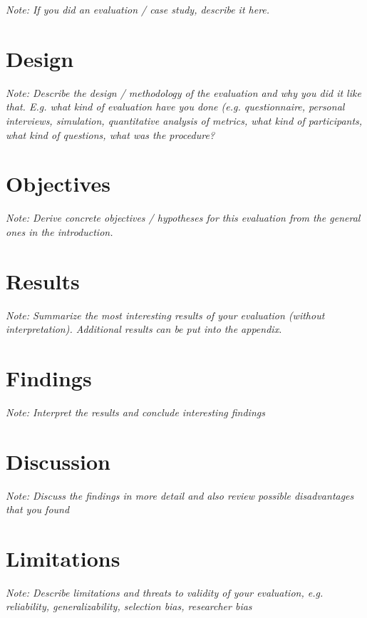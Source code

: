 \documentclass[a4paper,12pt,twoside]{report}
\begin{document}
\textit{Note: If you did an evaluation / case study, describe it here.}

\section{Design}

\textit{Note: Describe the design / methodology of the evaluation and why you did it like that. E.g. what kind of evaluation have you done (e.g. questionnaire, personal interviews, simulation, quantitative analysis of metrics, what kind of participants, what kind of questions, what was the procedure?}

\section{Objectives}

\textit{Note: Derive concrete objectives / hypotheses for this evaluation from the general ones in the introduction.}

\section{Results}

\textit{Note: Summarize the most interesting results of your evaluation (without interpretation). Additional results can be put into the appendix.}

\section{Findings}

\textit{Note: Interpret the results and conclude interesting findings}

\section{Discussion}

\textit{Note: Discuss the findings in more detail and also review possible disadvantages that you found}

\section{Limitations}

\textit{Note: Describe limitations and threats to validity of your evaluation, e.g. reliability, generalizability, selection bias, researcher bias}
\end{document}
